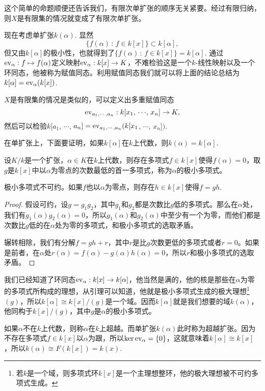 这个简单的命题顺便还告诉我们，有限次单扩张的顺序无关紧要。经过有限归纳，则$X$是有限集的情况就变成了有限次单扩张。

\para 现在考虑单扩张$k(\alpha)$. 显然
\[
	\{f(\alpha)\,:\, f\in k[x]\}\subset k[\alpha],
\]
但又由$k[\alpha]$的极小性，也就得到了$\{f(\alpha)\,:\, f\in k[x]\}=k[\alpha]$. 通过$\operatorname{ev}_{\alpha}:f\mapsto f(\alpha)$定义映射$\operatorname{ev}_{\alpha}:k[x]\to K$，不难检验这是一个$k$-线性映射以及一个环同态，他被称为赋值同态。利用赋值同态我们就可以将上面的结论总结为$k[\alpha]=\operatorname{ev}_{\alpha}(k[x])$.

$X$是有限集的情况是类似的，可以定义出多重赋值同态
\[
	\operatorname{ev}_{a_1,\cdots,a_n}:k[x_1,\,\cdots\!,\,x_n]\to K,
\]
然后可以检验$k[a_1$, $\cdots$, $a_n]=\operatorname{ev}_{a_1,\cdots,a_n}(k[x_1$, $\cdots$, $x_n])$.

在单扩张上，下面要证明，如果$k[\alpha]$在$k$上代数，则$k(\alpha)=k[\alpha]$.

\para 设$K/k$是一个扩张，$\alpha\in K$在$k$上代数，则存在多项式$f\in k[x]$使得$f(\alpha)=0$，取$g$是$k[x]$中以$\alpha$为零点的次数最低的首一多项式，称为$\alpha$的极小多项式。

\begin{lem}
极小多项式不可约。如果$f$也以$\alpha$为零点，则存在$h\in k[x]$使得$f=gh$.
\end{lem}

\begin{proof} 
	假设可约，设$g=g_1g_2$，其中$g_1$和$g_2$都是次数比$g$低的多项式。那么在$\alpha$处，我们有$g_1(\alpha)g_2(\alpha)=0$，所以$g_1(\alpha)$和$g_2(\alpha)$中至少有一个为零，而他们都是次数比$g$低的在$\alpha$处为零的多项式，和极小多项式的选取矛盾。

	辗转相除，我们有分解$f=gh+r$，其中$r$是比$g$次数更低的多项式或者$r=0$。如果是前者，在$\alpha$处$r(\alpha)=f(\alpha)-g(\alpha)h(\alpha)=0$，所以$r$和极小多项式的选取矛盾。
\end{proof}

我们已经知道了环同态$\operatorname{ev}_\alpha:k[x]\to k[\alpha]$，他当然是满的，他的核是那些在$\alpha$为零的多项式所构成的理想，从引理可以知道，他就是极小多项式生成的极大理想\footnote{若$k$是一个域，则多项式环$k[x]$是一个主理想整环，他的极大理想被不可约多项式生成。}$(g)$，所以$k[\alpha]\cong k[x]/(g)$是一个域。因而$k[\alpha]$就是我们想要的域$k(\alpha)$，他同构于$k[x]/(g)$，其中$g$是$\alpha$的极小多项式。

\para 如果$\alpha$不在$k$上代数，则称$\alpha$在$k$上超越。而单扩张$k(\alpha)$此时称为超越扩张。因为不存在多项式$f\in k[x]$以$\alpha$为跟，所以$\ker \operatorname{ev}_\alpha=\{0\}$，这就意味着$k[\alpha]\cong k[x]$，所以$k(\alpha)\cong F(k[x])=k(x)$.


